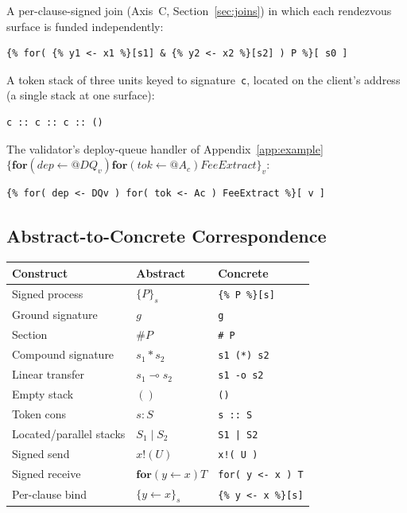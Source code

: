 \documentclass[11pt,a4paper]{article}
\makeatletter
\newcommand{\Par}{\mathbin{|}}
\newcommand{\forc}{\mathbf{for}}
\newcommand{\send}[2]{#1 !\!\left( #2 \right)}
\newcommand{\recv}[3]{\forc\!\left( #1 \leftarrow #2 \right) #3}
\newcommand{\quot}[1]{@#1}
\newcommand{\signed}[2]{\{#1\}_{#2}}
\newcommand{\comp}{\mathbin{*}}
\newcommand{\hashf}{\texttt{\#}}
\makeatother
\begin{document}
\noindent
A per-clause-signed join (Axis~C,
Section~\ref{sec:joins}) in which each rendezvous surface is
funded independently:
\begin{lstlisting}[style=rholang]
{% for( {% y1 <- x1 %}[s1] & {% y2 <- x2 %}[s2] ) P %}[ s0 ]
\end{lstlisting}

\noindent
A token stack of three units keyed to signature~\verb|c|,
located on the client's address (a single stack at one
surface):
\begin{lstlisting}[style=rholang]
c :: c :: c :: ()
\end{lstlisting}

\noindent
The validator's deploy-queue handler of
Appendix~\ref{app:example}
$\signed{\recv{\mathit{dep}}{\quot{DQ_v}}{
\recv{\mathit{tok}}{\quot{A_c}}{\mathit{FeeExtract}}}}{v}$:
\begin{lstlisting}[style=rholang]
{% for( dep <- DQv ) for( tok <- Ac ) FeeExtract %}[ v ]
\end{lstlisting}

\subsection{Abstract-to-Concrete Correspondence}
\label{app:concrete-table}

\begin{center}
  \begin{tabular}{lll}
    \textbf{Construct} & \textbf{Abstract} & \textbf{Concrete} \\
    \midrule
    Signed process & $\signed{P}{s}$
      & \verb|{% P %}[s]| \\
    Ground signature & $g$
      & \verb|g| \\
    Section & $\hashf P$
      & \verb|# P| \\
    Compound signature & $s_1 \comp s_2$
      & \verb|s1 (*) s2| \\
    Linear transfer & $s_1 \multimap s_2$
      & \verb|s1 -o s2| \\
    Empty stack & $()$
      & \verb|()| \\
    Token cons & $s : S$
      & \verb|s :: S| \\
    Located/parallel stacks & $S_1 \Par S_2$
      & \verb#S1 | S2# \\
    Signed send & $\send{x}{U}$
      & \verb|x!( U )| \\
    Signed receive & $\recv{y}{x}{T}$
      & \verb|for( y <- x ) T| \\
    Per-clause bind & $\signed{y \leftarrow x}{s}$
      & \verb|{% y <- x %}[s]| \\
  \end{tabular}
\end{center}
\end{document}
